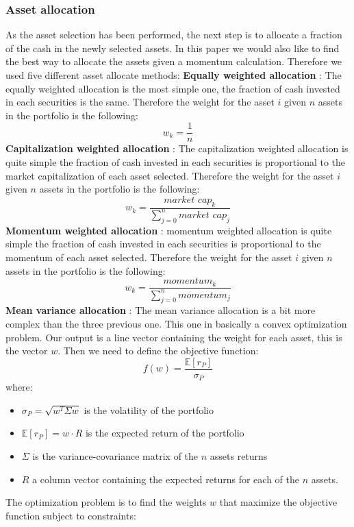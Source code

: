 \documentclass{article}
\begin{document}
\subsubsection{Asset allocation}
As the asset selection has been performed, the next step is to allocate a fraction of the cash in the newly selected assets. In this paper we would also like to find the best way to allocate the assets given a momentum calculation. Therefore we used five different asset allocate methods:\newline\newline
\textbf{Equally weighted allocation} : The equally weighted allocation is the most simple one, the fraction of cash invested in each securities is the same. Therefore the weight for the asset $i$ given $n$ assets in the portfolio is the following: $$w_k=\frac{1}{n}$$
\textbf{Capitalization weighted allocation} : The capitalization weighted allocation is quite simple the fraction of cash invested in each securities is proportional to the market capitalization of each asset selected. Therefore the weight for the asset $i$ given $n$ assets in the portfolio is the following: $$w_k=\frac{\textit{market cap}_k}{\sum_{j=0}^n\textit{market cap}_j}$$
\textbf{Momentum weighted allocation} : momentum weighted allocation is quite simple the fraction of cash invested in each securities is proportional to the momentum of each asset selected. Therefore the weight for the asset $i$ given $n$ assets in the portfolio is the following: $$w_k=\frac{\textit{momentum}_k}{\sum_{j=0}^n\textit{momentum}_j}$$
\textbf{Mean variance allocation} : The mean variance allocation is a bit more complex than the three previous one. This one in basically a convex optimization problem. Our output is a line vector containing the weight for each asset, this is the vector $w$. Then we need to define the objective function: $$f(w)=\frac{\mathbb{E}[r_P]}{\sigma_P}$$
where:
\begin{itemize}
	\item $\sigma_P=\sqrt{w^T \Sigma w}$ is the volatility of the portfolio
	\item $\mathbb{E}[r_P]=w \cdot R$ is the expected return of the portfolio
	\item $\Sigma$ is the variance-covariance matrix of the $n$ assets returns
	\item $R$ a column vector containing the expected returns for each of the $n$ assets.
\end{itemize}
The optimization problem is to find the weights $w$ that maximize the objective function subject to constraints:
\end{document}
